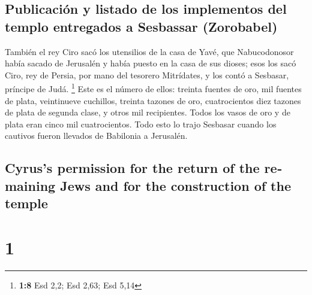 \begin{paracol}{2}
\hypertarget{publicaciuxf3n-y-listado-de-los-implementos-del-templo-entregados-a-sesbassar-zorobabel}{%
\subsection{Publicación y listado de los implementos del templo
entregados a Sesbassar
(Zorobabel)}\label{publicaciuxf3n-y-listado-de-los-implementos-del-templo-entregados-a-sesbassar-zorobabel}}

 También el rey Ciro sacó los utensilios de la casa de
Yavé, que Nabucodonosor había sacado de Jerusalén y había puesto en la
casa de sus dioses;  esos los sacó Ciro, rey de Persia,
por mano del tesorero Mitrídates, y los contó a Sesbasar, príncipe de
Judá. \footnote{\textbf{1:8} Esd 2,2; Esd 2,63; Esd 5,14} 
Este es el número de ellos: treinta fuentes de oro, mil fuentes de
plata, veintinueve cuchillos,  treinta tazones de oro,
cuatrocientos diez tazones de plata de segunda clase, y otros mil
recipientes.  Todos los vasos de oro y de plata eran
cinco mil cuatrocientos. Todo esto lo trajo Sesbasar cuando los cautivos
fueron llevados de Babilonia a Jerusalén.

\switchcolumn
\begin{otherlanguage}{english}

\hypertarget{cyruss-permission-for-the-return-of-the-remaining-jews-and-for-the-construction-of-the-temple}{%
\subsection{Cyrus's permission for the return of the remaining Jews and
for the construction of the
temple}\label{cyruss-permission-for-the-return-of-the-remaining-jews-and-for-the-construction-of-the-temple}}

\hypertarget{section-1}{%
\section{1}\label{section-1}}


\end{otherlanguage}
\end{paracol}

